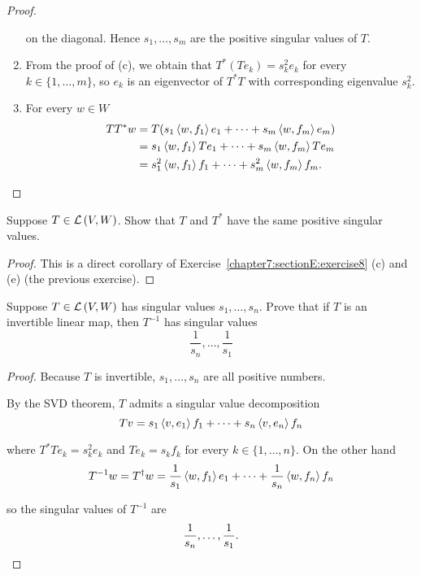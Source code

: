 \begin{proof}
\begin{enumerate}[label={(\alph*)}]
              on the diagonal. Hence $s_{1}, \ldots, s_{m}$ are the positive singular values of $T$.
        \item From the proof of (c), we obtain that $T^{*}(Te_{k}) = s_{k}^{2}e_{k}$ for every $k\in\{1,\ldots,m\}$, so $e_{k}$ is an eigenvector of $T^{*}T$ with corresponding eigenvalue $s_{k}^{2}$.
        \item For every $w\in W$
              \begin{align*}
                  TT^{*}w & = T(s_{1}\left\langle{w, f_{1}}\right\rangle e_{1} + \cdots + s_{m}\left\langle{w, f_{m}}\right\rangle e_{m})     \\
                          & = s_{1}\left\langle{w,f_{1}}\right\rangle Te_{1} + \cdots + s_{m}\left\langle{w,f_{m}}\right\rangle Te_{m}        \\
                          & = s_{1}^{2}\left\langle{w,f_{1}}\right\rangle f_{1} + \cdots + s_{m}^{2}\left\langle{w,f_{m}}\right\rangle f_{m}.
              \end{align*}
    \end{enumerate}
\end{proof}
\newpage

\begin{exercise}
    Suppose $T\in\mathcal{L}\left({V, W}\right)$. Show that $T$ and $T^{*}$ have the same positive singular values.
\end{exercise}

\begin{proof}
    This is a direct corollary of Exercise~\ref{chapter7:sectionE:exercise8} (c) and (e) (the previous exercise).
\end{proof}
\newpage

\begin{exercise}
    Suppose $T\in\mathcal{L}\left({V, W}\right)$ has singular values $s_{1}, \ldots, s_{n}$. Prove that if $T$ is an invertible linear map, then $T^{-1}$ has singular values
    \[
        \frac{1}{s_{n}}, \ldots, \frac{1}{s_{1}}
    \]
\end{exercise}

\begin{proof}
    Because $T$ is invertible, $s_{1}, \ldots, s_{n}$ are all positive numbers.

    By the SVD theorem, $T$ admits a singular value decomposition
    \[
        Tv = s_{1}\left\langle{v, e_{1}}\right\rangle f_{1} + \cdots + s_{n}\left\langle{v, e_{n}}\right\rangle f_{n}
    \]

    where $T^{*}Te_{k} = s_{k}^{2}e_{k}$ and $Te_{k} = s_{k}f_{k}$ for every $k\in\{1,\ldots,n\}$. On the other hand
    \[
        T^{-1}w = T^{\dagger}w = \frac{1}{s_{1}}\left\langle{w,f_{1}}\right\rangle e_{1} + \cdots + \frac{1}{s_{n}}\left\langle{w,f_{n}}\right\rangle f_{n}
    \]

    so the singular values of $T^{-1}$ are
    \[
        \frac{1}{s_{n}}, \ldots, \frac{1}{s_{1}}.\qedhere
    \]
\end{proof}
\newpage

